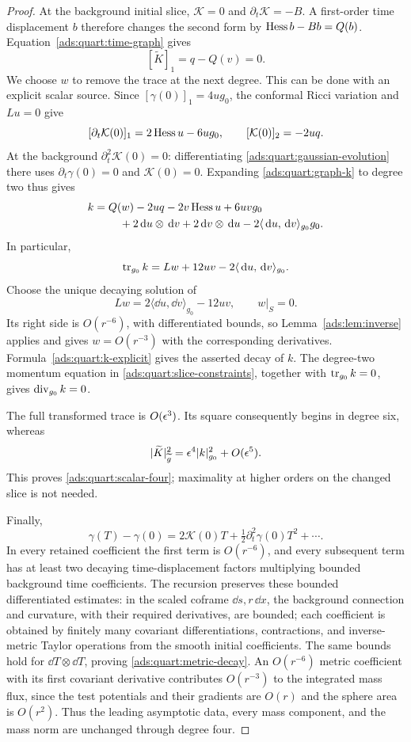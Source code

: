 \begin{proof}
At the background initial slice, \(\mathcal K=0\) and
\(\partial_t\mathcal K=-B\).  A first-order time displacement \(b\)
therefore changes the second form by
\(\operatorname{Hess} b-Bb=Q(b)\).  Equation~\eqref{ads:quart:time-graph} gives
\[
 [\widetilde K]_1=q-Q(v)=0.
\]
We choose \(w\) to remove the trace at the next degree.  This can be
done with an explicit scalar source.  Since
\([\gamma(0)]_1=4ug_0\), the conformal Ricci variation and \(Lu=0\)
give
\[
 [\partial_t\mathcal K(0)]_1
   =2\operatorname{Hess} u-6ug_0,
 \qquad [\mathcal K(0)]_2=-2uq.
\]
At the background \(\partial_t^2\mathcal K(0)=0\): differentiating
\eqref{ads:quart:gaussian-evolution} there uses
\(\partial_t\gamma(0)=0\) and \(\mathcal K(0)=0\).
Expanding \eqref{ads:quart:graph-k} to degree two thus gives
\begin{align}
 k={}&Q(w)-2uq-2v\operatorname{Hess} u+6uvg_0\nonumber\\
     &\quad+2\,\mathrm d u\otimes\,\mathrm d v+2\,\mathrm d v\otimes\,\mathrm d u
          -2\langle\,\mathrm d u,\,\mathrm d v\rangle_{g_0}g_0.
 \label{ads:quart:k-explicit}
\end{align}
In particular,
\[
 \operatorname{tr}_{g_0}k=Lw+12uv-2\langle\,\mathrm d u,\,\mathrm d v\rangle_{g_0}.
\]
Choose the unique decaying solution of
\begin{equation}
 Lw=2\langle\dd u,\dd v\rangle_{g_0}-12uv,
 \qquad w|_S=0.
 \label{ads:quart:w-equation}
\end{equation}
Its right side is \(O(r^{-6})\), with differentiated bounds, so
Lemma~\ref{ads:lem:inverse} applies and gives \(w=O(r^{-3})\) with the
corresponding derivatives.  Formula~\eqref{ads:quart:k-explicit} gives the
asserted decay of \(k\).  The degree-two momentum equation in
\eqref{ads:quart:slice-constraints}, together with \(\operatorname{tr}_{g_0}k=0\),
gives \(\operatorname{div}_{g_0}k=0\).

The full transformed trace is \(O(\epsilon^3)\).  Its square consequently
begins in degree six, whereas
\[
 |\widetilde K|_{\widetilde g}^2
    =\epsilon^4|k|_{g_0}^2+O(\epsilon^5).
\]
This proves \eqref{ads:quart:scalar-four}; maximality at higher orders on
the changed slice is not needed.

Finally,
\[
 \gamma(T)-\gamma(0)
  =2\mathcal K(0)T+\tfrac12\partial_t^2\gamma(0)T^2+\cdots.
\]
In every retained coefficient the first term is \(O(r^{-6})\), and
every subsequent term has at least two decaying time-displacement
factors multiplying bounded background time coefficients.  The
recursion preserves these bounded differentiated estimates: in the
scaled coframe \(\dd s,r\,\dd x\), the background connection and
curvature, with their required derivatives, are bounded; each
coefficient is obtained by finitely many covariant differentiations,
contractions, and inverse-metric Taylor operations from the smooth
initial coefficients.  The
same bounds hold for \(\dd T\otimes\dd T\), proving
\eqref{ads:quart:metric-decay}.  An \(O(r^{-6})\) metric coefficient with
its first covariant derivative contributes \(O(r^{-3})\) to the
integrated mass flux, since the test potentials and their gradients
are \(O(r)\) and the sphere area is \(O(r^2)\).  Thus the leading
asymptotic data, every mass component, and the mass norm are unchanged
through degree four.


\end{proof}
